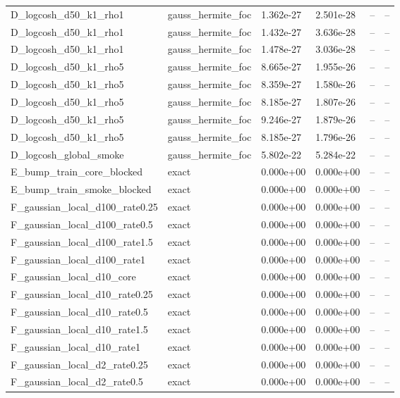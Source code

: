 \begin{tabular}{llllll}
D\_logcosh\_d50\_k1\_rho1 & gauss\_hermite\_foc & 1.362e-27 & 2.501e-28 & -- & -- \\
D\_logcosh\_d50\_k1\_rho1 & gauss\_hermite\_foc & 1.432e-27 & 3.636e-28 & -- & -- \\
D\_logcosh\_d50\_k1\_rho1 & gauss\_hermite\_foc & 1.478e-27 & 3.036e-28 & -- & -- \\
D\_logcosh\_d50\_k1\_rho5 & gauss\_hermite\_foc & 8.665e-27 & 1.955e-26 & -- & -- \\
D\_logcosh\_d50\_k1\_rho5 & gauss\_hermite\_foc & 8.359e-27 & 1.580e-26 & -- & -- \\
D\_logcosh\_d50\_k1\_rho5 & gauss\_hermite\_foc & 8.185e-27 & 1.807e-26 & -- & -- \\
D\_logcosh\_d50\_k1\_rho5 & gauss\_hermite\_foc & 9.246e-27 & 1.879e-26 & -- & -- \\
D\_logcosh\_d50\_k1\_rho5 & gauss\_hermite\_foc & 8.185e-27 & 1.796e-26 & -- & -- \\
D\_logcosh\_global\_smoke & gauss\_hermite\_foc & 5.802e-22 & 5.284e-22 & -- & -- \\
E\_bump\_train\_core\_blocked & exact & 0.000e+00 & 0.000e+00 & -- & -- \\
E\_bump\_train\_smoke\_blocked & exact & 0.000e+00 & 0.000e+00 & -- & -- \\
F\_gaussian\_local\_d100\_rate0.25 & exact & 0.000e+00 & 0.000e+00 & -- & -- \\
F\_gaussian\_local\_d100\_rate0.5 & exact & 0.000e+00 & 0.000e+00 & -- & -- \\
F\_gaussian\_local\_d100\_rate1.5 & exact & 0.000e+00 & 0.000e+00 & -- & -- \\
F\_gaussian\_local\_d100\_rate1 & exact & 0.000e+00 & 0.000e+00 & -- & -- \\
F\_gaussian\_local\_d10\_core & exact & 0.000e+00 & 0.000e+00 & -- & -- \\
F\_gaussian\_local\_d10\_rate0.25 & exact & 0.000e+00 & 0.000e+00 & -- & -- \\
F\_gaussian\_local\_d10\_rate0.5 & exact & 0.000e+00 & 0.000e+00 & -- & -- \\
F\_gaussian\_local\_d10\_rate1.5 & exact & 0.000e+00 & 0.000e+00 & -- & -- \\
F\_gaussian\_local\_d10\_rate1 & exact & 0.000e+00 & 0.000e+00 & -- & -- \\
F\_gaussian\_local\_d2\_rate0.25 & exact & 0.000e+00 & 0.000e+00 & -- & -- \\
F\_gaussian\_local\_d2\_rate0.5 & exact & 0.000e+00 & 0.000e+00 & -- & -- \\

\end{tabular}
